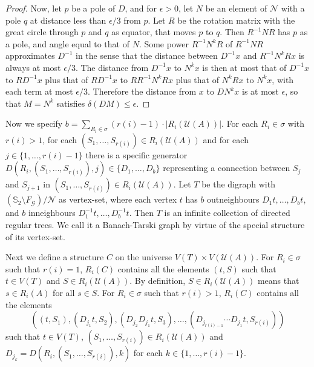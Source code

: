 \documentclass{lmcs}
\begin{document}
\begin{proof}
Now, let $p$ be a pole of $D$, and for $\epsilon> 0$, let $N$ be an element of $\mathcal{N}$ with a pole $q$ 
at distance less than $\epsilon/3$ from $p$. Let $R$ be the rotation matrix with the great circle through
$p$ and $q$ as equator, that moves $p$ to $q$. Then $R^{-1}NR$ has $p$ as a pole, and angle equal to that of $N$.
Some power $R^{-1}N^kR$ of $R^{-1}NR$ approximates $D^{-1}$ in the sense that the distance between $D^{-1}x$ and
$R^{-1}N^kRx$ is always at most $\epsilon/3$. The distance from $D^{-1} x$ to $N^k x$ is then at most that of
$D^{-1} x$ to $R D^{-1} x$ plus that of $R D^{-1} x$ to $R R^{-1}N^kR x$ plus that of $N^kR x$ to $N^k x$,
with each term at most $\epsilon/3$. Therefore the distance from $x$ to $D N^k x$ is at most $\epsilon$, so that $M = N^k$ satisfies
$\delta(DM) \leq \epsilon.$
\end{proof}

Now we specify $b = \sum_{R_i \in \sigma} (r(i)-1) \cdot \left \lvert R_i(\mathcal{U}(A)) \right \rvert$.
For each  $R_i \in \sigma$ with $r(i) > 1$, for each $(S_1, \ldots, S_{r(i)}) \in R_i(\mathcal{U}(A))$
and for each $j \in \{1, \ldots, r(i)-1\}$ there is a specific generator 
$D\left (R_i,(S_1, \ldots, S_{r(i)}),j\right ) \in \{D_1, \ldots, D_b\}$ representing a connection between
$S_j$ and $S_{j+1}$ in $(S_1, \ldots, S_{r(i)}) \in R_i(\mathcal{U}(A))$.
Let $T$ be the digraph with $(\mathbb{S}_2 \setminus F_{\mathcal{G}})/\mathcal{N}$ as vertex-set, where each vertex
$t$ has $b$ outneighbours $D_1 t, \ldots, D_b t$, and $b$ inneighbours $D_1^{-1} t, \ldots, D_b^{-1} t$.
Then $T$ is an infinite collection of directed regular trees.
We call it a Banach-Tarski graph by virtue of the special structure of its vertex-set.

Next we define a structure $C$ on the universe $V(T) \times V(\mathcal{U}(A))$.
For $R_i \in \sigma$ such that $r(i) = 1$, $R_i(C)$ contains all the elements 
$(t,S)$ such that $t \in V(T)$ and $S \in R_i(\mathcal{U}(A))$. By definition,
$S \in R_i(\mathcal{U}(A))$ means that $s \in R_i(A)$ for all $s \in S$.
For $R_i \in \sigma$ such that $r(i) > 1$,
$R_i(C)$ contains all the elements 
$$\left ((t,S_1),(D_{j_1} t,S_2), (D_{j_2} D_{j_1} t, S_3), \ldots, (D_{j_{r(i)-1}} \cdots D_{j_1} t, S_{r(i)})\right )$$
such that $t \in V(T)$, $(S_1, \ldots, S_{r(i)}) \in R_i(\mathcal{U}(A))$ and
$D_{j_k} = D(R_i,(S_1, \ldots, S_{r(i)}),k)$ for each $k \in \{1, \ldots, r(i)-1\}$.\\
\end{document}

